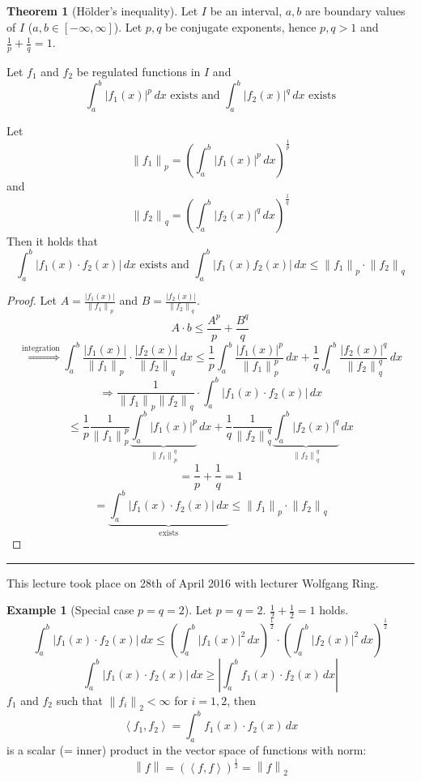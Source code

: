 \documentclass[a4paper,landscape,twocolumn]{article}
\theoremstyle{definition}
\newtheorem{theorem}{Theorem}
\newtheorem{ex}{Example}
\newcommand\abs[1]{\left|#1\right|}
\newcommand\meta[3]{\hrule{} This #1 took place on #2 with lecturer #3.\par}
\newcommand\norm[1]{\left\|#1\right\|}
\newcommand\fun[1]{\left\langle{#1}\right\rangle}
\begin{document}
\begin{theorem}[Hölder's inequality]
  Let $I$ be an interval, $a, b$ are boundary values of $I$ ($a,b \in [-\infty, \infty]$).
  Let $p,q$ be conjugate exponents, hence $p,q > 1$ and $\frac1p + \frac1q = 1$.

  Let $f_1$ and $f_2$ be regulated functions in $I$ and
  \[ \int_a^b \abs{f_1(x)}^p \, dx \text{ exists and } \int_a^b \abs{f_2(x)}^q \, dx \text{ exists} \]

  Let
  \[ \norm{f_1}_p = \left(\int_a^b \abs{f_1(x)}^p \, dx\right)^{\frac1p} \]
  and
  \[ \norm{f_2}_q = \left(\int_a^b \abs{f_2(x)}^q \, dx\right)^{\frac1q} \]
  Then it holds that
  \[
    \int_a^b \abs{f_1(x) \cdot f_2(x)} \, dx \text{ exists and }
    \int_a^b \abs{f_1(x) f_2(x)} \, dx
    \leq \norm{f_1}_p \cdot \norm{f_2}_q
  \]
\end{theorem}
\begin{proof}
  Let $A = \frac{\abs{f_1(x)}}{\norm{f_1}_p}$ and $B = \frac{\abs{f_2(x)}}{\norm{f_2}_q}$.
  \[
    A \cdot b \leq \frac{A^p}{p} + \frac{B^q}{q}
  \] \[
    \overset{\text{integration}}{\Rightarrow}
    \int_a^b \frac{\abs{f_1(x)}}{\norm{f_1}_p} \cdot \frac{\abs{f_2(x)}}{\norm{f_2}_q} \, dx
    \leq \frac1p \int_a^b \frac{\abs{f_1(x)}^p}{\norm{f_1}_p^p} \, dx
    + \frac1q \int_a^b \frac{\abs{f_2(x)}^q}{\norm{f_2}_q^q} \, dx
  \] \[
    \Rightarrow \frac{1}{\norm{f_1}_p \norm{f_2}_q} \cdot
    \int_a^b \abs{f_1(x) \cdot f_2(x)} \, dx
  \] \[
    \leq \frac{1}{p} \frac{1}{\norm{f_1}_p^p} \underbrace{\int_a^b \abs{f_1(x)}^p}_{\norm{f_1}_p^q} \, dx
    + \frac1q \frac1{\norm{f_2}_q^q} \underbrace{\int_a^b \abs{f_2(x)}^q}_{\norm{f_2}_q^q} \, dx
  \] \[
    = \frac1p + \frac1q = 1
  \] \[
    = \underbrace{\int_a^b \abs{f_1(x) \cdot f_2(x)} \, dx}_{\text{exists}}
    \leq \norm{f_1}_p \cdot \norm{f_2}_q
  \]
\end{proof}

\meta{lecture}{28th of April 2016}{Wolfgang Ring}

\begin{ex}[Special case $p = q = 2$]
  Let $p = q = 2$. $\frac12 + \frac12 = 1$ holds.
  \[
    \int_a^b \abs{f_1(x) \cdot f_2(x)} \, dx
    \leq \left(\int_a^b \abs{f_1(x)}^2 \, dx\right)^{\frac12}
    \cdot \left(\int_a^b \abs{f_2(x)}^2 \, dx\right)^{\frac12}
  \] \[
    \int_a^b \abs{f_1(x) \cdot f_2(x)} \, dx \geq \abs{\int_a^b f_1(x) \cdot f_2(x) \, dx}
  \]
  $f_1$ and $f_2$ such that $\norm{f_i}_2 < \infty$ for $i = 1,2$,
  then
  \[ \fun{f_1, f_2} = \int_a^b f_1(x) \cdot f_2(x) \, dx \]
  is a scalar (= inner) product in the vector space of functions
  with norm:
  \[
    \norm{f} = (\fun{f, f})^{\frac12} = \norm{f}_2
  \]
\end{ex}
\end{document}

